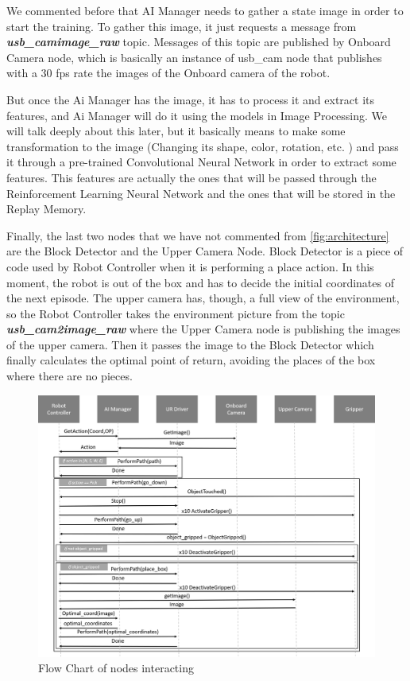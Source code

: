 		We commented before that AI Manager needs to gather a state image in order to start the training. To gather this image, it just requests a message from \textbf{\textendash \textit{usb\_cam\textendash image\_raw}} topic. Messages of this topic are published by Onboard Camera node, which is basically an instance of usb\_cam node that publishes with a 30 fps rate the images of the Onboard camera of the robot. 
		
		But once the Ai Manager has the image, it has to process it and extract its features, and Ai Manager will do it using the models in Image Processing. We will talk deeply about this later, but it basically means to make some transformation to the image (Changing its shape, color, rotation, etc. ) and pass it through a pre-trained Convolutional Neural Network in order to extract some features. This features are actually the ones that will be passed through the Reinforcement Learning Neural Network and the ones that will be stored in the Replay Memory.
		
		Finally, the last two nodes that we have not commented from \autoref{fig:architecture} are the Block Detector and the Upper Camera Node. Block Detector is a piece of code used by Robot Controller when it is performing a place action. In this moment, the robot is out of the box and has to decide the initial coordinates of the next episode. The upper camera has, though, a full view of the environment, so the Robot Controller takes the environment picture from the topic \textbf{\textendash \textit{usb\_cam2\textendash image\_raw}} where the Upper Camera node is publishing the images of the upper camera. Then it passes the image to the Block Detector which finally calculates the optimal point of return, avoiding the places of the box where there are no pieces.
		
		\begin{figure}[H]
			\centering
			\includegraphics[width=1\linewidth]{Images/NodeInteraction}
			\caption[Node Interction]{Flow Chart of nodes interacting}
			\label{fig:nodeinteraction}
		\end{figure}
	
